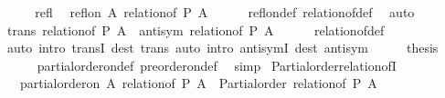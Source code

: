 \begin{isabellebody}
%
\isadelimproof
%
\endisadelimproof
%
\isatagproof
{}\isamarkupfalse%
\ {\isacharminus}{\kern0pt}\isanewline
\ \ \isamarkupfalse%
\ refl\ \isamarkupfalse%
\ {\isachardoublequoteopen}refl{\isacharunderscore}{\kern0pt}on\ A\ {\isacharparenleft}{\kern0pt}relation{\isacharunderscore}{\kern0pt}of\ P\ A{\isacharparenright}{\kern0pt}{\isachardoublequoteclose}\isanewline
\ \ \ \ \isamarkupfalse%
\ refl{\isacharunderscore}{\kern0pt}on{\isacharunderscore}{\kern0pt}def\ relation{\isacharunderscore}{\kern0pt}of{\isacharunderscore}{\kern0pt}def\ \isamarkupfalse%
\ auto\isanewline
\ \ \isamarkupfalse%
\ \isamarkupfalse%
\ {\isachardoublequoteopen}trans\ {\isacharparenleft}{\kern0pt}relation{\isacharunderscore}{\kern0pt}of\ P\ A{\isacharparenright}{\kern0pt}{\isachardoublequoteclose}\ \ {\isachardoublequoteopen}antisym\ {\isacharparenleft}{\kern0pt}relation{\isacharunderscore}{\kern0pt}of\ P\ A{\isacharparenright}{\kern0pt}{\isachardoublequoteclose}\isanewline
\ \ \ \ \isamarkupfalse%
\ relation{\isacharunderscore}{\kern0pt}of{\isacharunderscore}{\kern0pt}def\isanewline
\ \ \ \ \isamarkupfalse%
\ {\isacharparenleft}{\kern0pt}auto\ intro{\isacharcolon}{\kern0pt}\ transI\ dest{\isacharcolon}{\kern0pt}\ trans{\isacharcomma}{\kern0pt}\ auto\ intro{\isacharcolon}{\kern0pt}\ antisymI\ dest{\isacharcolon}{\kern0pt}\ antisym{\isacharparenright}{\kern0pt}\isanewline
\ \ \isamarkupfalse%
\ \isamarkupfalse%
\ {\isacharquery}{\kern0pt}thesis\isanewline
\ \ \ \ \isamarkupfalse%
\ partial{\isacharunderscore}{\kern0pt}order{\isacharunderscore}{\kern0pt}on{\isacharunderscore}{\kern0pt}def\ preorder{\isacharunderscore}{\kern0pt}on{\isacharunderscore}{\kern0pt}def\ \isamarkupfalse%
\ simp\isanewline
{}\isamarkupfalse%
%
\endisatagproof
{\isafoldproof}%
%
\isadelimproof
\isanewline
%
\endisadelimproof
\isanewline
{}\isamarkupfalse%
\ Partial{\isacharunderscore}{\kern0pt}order{\isacharunderscore}{\kern0pt}relation{\isacharunderscore}{\kern0pt}ofI{\isacharcolon}{\kern0pt}\isanewline
\ \ \ {\isachardoublequoteopen}partial{\isacharunderscore}{\kern0pt}order{\isacharunderscore}{\kern0pt}on\ A\ {\isacharparenleft}{\kern0pt}relation{\isacharunderscore}{\kern0pt}of\ P\ A{\isacharparenright}{\kern0pt}{\isachardoublequoteclose}\ \ {\isachardoublequoteopen}Partial{\isacharunderscore}{\kern0pt}order\ {\isacharparenleft}{\kern0pt}relation{\isacharunderscore}{\kern0pt}of\ P\ A{\isacharparenright}{\kern0pt}{\isachardoublequoteclose}\isanewline

\end{isabellebody}
